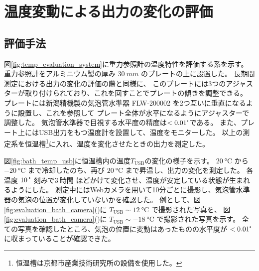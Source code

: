 \documentclass[../../main.tex]{subfiles}
\begin{document}
\section{温度変動による出力の変化の評価}
\subsection{評価手法}
図\ref{fig:temp_evaluation_system}に重力参照計の温度特性を評価する系を示す。
重力参照計をアルミニウム製の厚み $\SI{30}{mm}$ のプレートの上に設置した。
長期間測定における出力の変化の評価の際と同様に、
このプレートには3つのアジャスターが取り付けられており、これを回すことでプレートの傾きを調整できる。
プレートには新潟精機製の気泡管水準器 FLW-200002 を2つ互いに垂直になるように設置し、これを参照して
プレート全体が水平になるようにアジャスターで調整した。
気泡管水準器で目視する水平度の精度は$< 0.01\tcdegree$である。
また、プレート上にはUSB出力をもつ温度計を設置して、温度をモニターした。
以上の測定系を恒温槽\footnote{恒温槽は京都市産業技術研究所の設備を使用した。}に入れ、温度を変化させたときの出力を測定した。

図\ref{fig:bath_temp_usb}に恒温槽内の温度$T_{\mathrm{USB}}$の変化の様子を示す。
$\SI{20}{\degreeCelsius}$ から $\SI{-20}{\degreeCelsius}$ まで冷却したのち、再び $\SI{20}{\degreeCelsius}$ まで昇温し、出力の変化を測定した。
各温度 $\SI{10}{\tcdegree}$ 刻みで$\SI{3}{時間}$ ほどかけて変化させ、温度が安定している状態が生まれるようにした。
測定中にはWebカメラを用いて10分ごとに撮影し、気泡管水準器の気泡の位置が変化していないかを確認した。
例として、図\ref{fig:evaluation_bath_camera}()に
$T_{\mathrm{USB}} \sim \SI{12}{\degreeCelsius}$ で撮影された写真を、
図\ref{fig:evaluation_bath_camera}()に
$T_{\mathrm{USB}} \sim \SI{-18}{\degreeCelsius}$ で撮影された写真を示す。
全ての写真を確認したところ、気泡の位置に変動はあったものの水平度が $< 0.01\tcdegree$ に収まっていることが確認できた。
\end{document}

